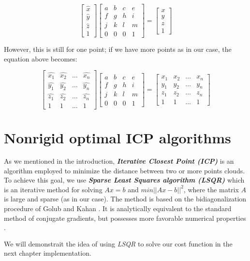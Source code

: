 \documentclass[../structure.tex]{subfiles}
\begin{document}
\begin{equation*}
\begin{bmatrix}
\hat{x} \\ \hat{y} \\ \hat{z} \\ 1
\end{bmatrix}
\begin{bmatrix}
a & b & c & e\\
f & g & h & i\\
j & k & l & m\\
0 & 0 & 0 & 1
\end{bmatrix}
=
\begin{bmatrix}
x \\ y \\ z \\ 1
\end{bmatrix}
\end{equation*}

However,  this is still for one point; if we have more points as in our case, the equation above becomes:

\begin{equation*}
\begin{bmatrix}
\hat{x_{1}} & \hat{x_{2}} & \dots & \hat{x_{n}}\\
\hat{y_{1}} & \hat{y_{2}} & \dots & \hat{y_{n}}\\
\hat{z_{1}} & \hat{z_{2}} & \dots & \hat{z_{n}}\\
1 & 1 & \dots & 1
\end{bmatrix}
\begin{bmatrix}
a & b & c & e\\
f & g & h & i\\
j & k & l & m\\
0 & 0 & 0 & 1
\end{bmatrix}
=
\begin{bmatrix}
x_{1} & x_{2} & \dots & x_{n}\\
y_{1} & y_{2} & \dots & y_{n}\\
z_{1} & z_{2} & \dots & z_{n}\\
1 & 1 & \dots & 1
\end{bmatrix}
\end{equation*}

\section{Nonrigid optimal ICP algorithms}
As we mentioned in the introduction, \textit{\textbf{ Iterative Closest Point (ICP)}} is an algorithm employed to minimize the distance between two or more points clouds. To achieve this goal, we use \textit{\textbf{Sparse Least Squares algorithm (LSQR)}} which is an iterative method for solving $Ax=b$ and $min||Ax-b||^2$, where the matrix $A$ is large and sparse (as in our case). The method is based on the bidiagonalization procedure of Golub and Kahan \cite{Paige1982a}. It is analytically equivalent to the standard method of conjugate gradients, but possesses more favorable numerical properties \cite{Paige1982a}.

We will demonstrait the idea of using \textit{LSQR} to solve our cost function in the next chapter implementation.
\end{document}
